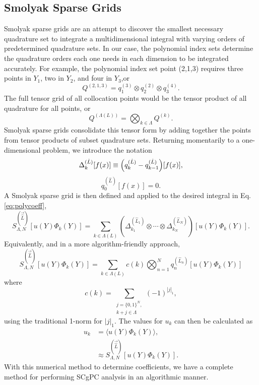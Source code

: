 \subsection{Smolyak Sparse Grids}
Smolyak sparse grids \cite{smolyak} are an attempt to discover the smallest necessary quadrature set to
integrate a multidimensional integral with varying orders of predetermined quadrature sets.  In our case, the
polynomial index sets determine the quadrature orders each one needs in each dimension to be integrated
accurately.  For example, the polynomial index set point (2,1,3) requires three points in $Y_1$, two in $Y_2$,
and four in $Y_3$,or
\begin{equation}
  Q^{(2,1,3)} = q^{(3)}_1 \otimes q^{(2)}_2 \otimes q^{(4)}_3.
\end{equation}
The full tensor grid of all collocation points would be the tensor product of all quadrature for all points,
or
\begin{equation}
  Q^{(\Lambda(L))} = \bigotimes_{k\in\Lambda}Q^{(k)}.
\end{equation}
Smolyak sparse grids consolidate this tensor form by adding together the points from tensor products of subset
quadrature sets.  Returning momentarily to a one-dimensional problem, we introduce the notation
\begin{equation}
  \Delta_k^{(\hat L)}[f(x)] \equiv \qty(q_k^{(\hat L)} - q_{k-1}^{(\hat L)})[f(x)],
\end{equation}
\begin{equation}
  q_0^{(\hat L)}[f(x)] = 0.
\end{equation}
A Smolyak sparse grid is then defined and applied to the desired integral in Eq. \ref{eq:polycoeff},
\begin{equation}
  S^{(\vec{\hat L})}_{\Lambda,N}[u(Y)\Phi_k(Y)] = \sum_{k\in\Lambda(L)} \left(\Delta_{k_1}^{(\hat L_1)} \otimes \cdots \otimes
  \Delta_{k_N}^{(\hat L_N)}\right)[u(Y)\Phi_k(Y)].
\end{equation}
Equivalently, and in a more algorithm-friendly approach,
\begin{equation}
  S^{(\vec{\hat L})}_{\Lambda,N}[u(Y)\Phi_k(Y)] = \sum_{k\in\Lambda(L)} c(k)\bigotimes_{n=1}^N
  q^{(\hat L_n)}_n[u(Y)\Phi_k(Y)]
\end{equation}
where
\begin{equation}
  c(k) = \sum_{\substack{j=\{0,1\}^N,\\k+j\in\Lambda}} (-1)^{|j|_1},
\end{equation}
using the traditional 1-norm for $|j|_1$.
The values for $u_k$ can then be calculated as
\begin{align}
  u_k &= \langle u(Y)\Phi_k(Y) \rangle,\\
      &\approx S^{(\vec{\hat L})}_{\Lambda,N}[u(Y)\Phi_k(Y)].
\end{align}
With this numerical method to determine coefficients, we have a complete method for performing SCgPC
analysis in an algorithmic manner.


